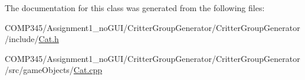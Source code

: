 The documentation for this class was generated from the following files\+:\begin{DoxyCompactItemize}
\item 
C\+O\+M\+P345/\+Assignment1\+\_\+no\+G\+U\+I/\+Critter\+Group\+Generator/\+Critter\+Group\+Generator/include/\hyperlink{_cat_8h}{Cat.\+h}\item 
C\+O\+M\+P345/\+Assignment1\+\_\+no\+G\+U\+I/\+Critter\+Group\+Generator/\+Critter\+Group\+Generator/src/game\+Objects/\hyperlink{_cat_8cpp}{Cat.\+cpp}\end{DoxyCompactItemize}
